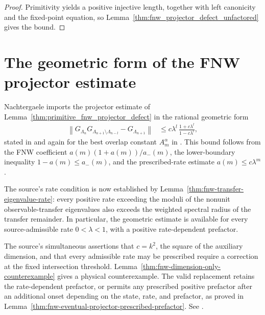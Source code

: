 \begin{proof}
    \leanok
    Primitivity yields a positive injective length, together with left
    canonicity and the fixed-point equation, so
    Lemma~\ref{thm:fnw_projector_defect_unfactored} gives the bound.
\end{proof}


\section{The geometric form of the FNW projector estimate}

Nachtergaele imports the projector estimate of
Lemma~\ref{thm:primitive_fnw_projector_defect} in the rational geometric form
\begin{align}
    \left\lVert
    G_{\Lambda_n}G_{\Lambda_{n+1}\setminus\Lambda_{n-l}}
    -G_{\Lambda_{n+1}}
    \right\rVert
     & \leq c\lambda^l\,\frac{1+c\lambda^l}{1-c\lambda^l},
    \label{eq:nachtergaele_geometric_projector_defect}
\end{align}
stated in \cite[lines~1180--1194]{Nachtergaele1996Spectral} and again for the
best overlap constant $A^\alpha_m$ in
\cite[Equation~(6.1)]{Nachtergaele1996Spectral}.  This bound follows from the
FNW coefficient $a(m)(1+a(m))/a_-(m)$, the lower-boundary inequality
$1-a(m)\leq a_-(m)$, and the prescribed-rate estimate $a(m)\leq c\lambda^m$.

The source's rate condition is now established by
Lemma~\ref{thm:fnw-transfer-eigenvalue-rate}: every positive rate exceeding
the moduli of the nonunit observable-transfer eigenvalues also exceeds the
weighted spectral radius of the transfer remainder. In particular, the
geometric estimate is available for every source-admissible rate
$0<\lambda<1$, with a positive rate-dependent prefactor.

The source's simultaneous assertions that $c=k^2$, the square of the auxiliary
dimension, and that every admissible rate may be prescribed require a correction
at the fixed intersection threshold. Lemma~\ref{thm:fnw-dimension-only-counterexample}
gives a physical counterexample. The valid replacement retains the
rate-dependent prefactor, or permits any prescribed positive prefactor after
an additional onset depending on the state, rate, and prefactor, as proved in
Lemma~\ref{thm:fnw-eventual-projector-prescribed-prefactor}. See
\cite{gap:cpgsv21_martingale_overlap}.

